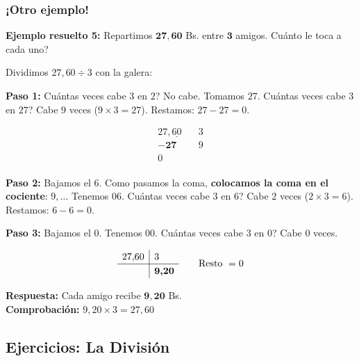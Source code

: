 \documentclass[12pt, letterpaper]{article}
\begin{document}
\subsubsection*{¡Otro ejemplo!}

\noindent\textbf{Ejemplo resuelto 5:} Repartimos $\boldsymbol{27{,}60}$ Bs. entre $\boldsymbol{3}$ amigos. \textquestiondown Cuánto le toca a cada uno?

\begin{cuadrosolucion}
  Dividimos $27{,}60 \div 3$ con la galera:

  \textbf{Paso 1:} \textquestiondown Cuántas veces cabe $3$ en $2$? No cabe. Tomamos $27$. \textquestiondown Cuántas veces cabe $3$ en $27$? Cabe $9$ veces ($9 \times 3 = 27$). Restamos: $27 - 27 = 0$.

  \[
    \renewcommand{\arraystretch}{1.2}
    \begin{array}{r|l}
      27{,}\underline{60}         & 3 \\ \hline
      \mathbf{-27}\phantom{{,}60} & 9 \\
      0\phantom{{,}60}            &
    \end{array}
  \]

  \textbf{Paso 2:} Bajamos el $6$. Como pasamos la coma, \textbf{colocamos la coma en el cociente}: $9{,}\ldots$ Tenemos $06$. \textquestiondown Cuántas veces cabe $3$ en $6$? Cabe $2$ veces ($2 \times 3 = 6$). Restamos: $6 - 6 = 0$.

  \textbf{Paso 3:} Bajamos el $0$. Tenemos $00$. \textquestiondown Cuántas veces cabe $3$ en $0$? Cabe $0$ veces.

  \[
    \renewcommand{\arraystretch}{1.2}
    \begin{array}{r|l}
      27{,}60 & 3                   \\ \hline
              & \boldsymbol{9{,}20} \\
    \end{array}
    \qquad \text{Resto } = 0
  \]

  \textbf{Respuesta:} Cada amigo recibe $\boldsymbol{9{,}20}$ Bs.\\
  \textbf{Comprobación:} $9{,}20 \times 3 = 27{,}60$ \checkmark
\end{cuadrosolucion}

\subsection{Ejercicios: La División}
\end{document}
